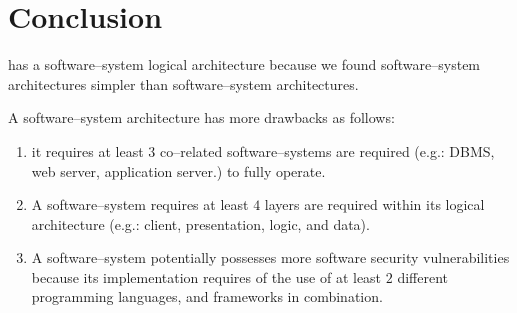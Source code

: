 \chapter{Conclusion}

\yerotherpblack has a \thickclient
software--system logical architecture
because we found \thickclient software--system
architectures simpler than \webbrowserbased
software--system architectures.

A \webbrowserbased software--system
architecture has more drawbacks as
follows:

\begin{enumerate}[1)]
	\item it requires at least $3$ co--related 
		software--systems are required 
		(e.g.: DBMS, web server, application server.)
		to fully operate.
		
	\item A \webbrowserbased software--system
		requires at least $4$ layers are
		required within its logical architecture
		(e.g.: client, presentation, logic, and data).

	\item A \webbrowserbased software--system
		potentially possesses more software
		security vulnerabilities because its
		implementation requires of the use of
		at least $2$ different programming 
		languages, and frameworks in combination.
\end{enumerate}